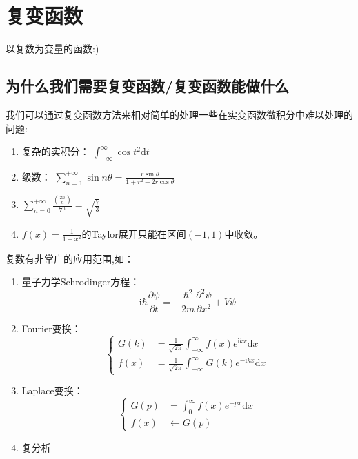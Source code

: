 % 
% 
\chapter{复变函数}
	以复数为变量的函数:)
\section{为什么我们需要复变函数/复变函数能做什么}
我们可以通过复变函数方法来相对简单的处理一些在实变函数微积分中难以处理的问题:
\begin{enumerate}[fullwidth,itemindent=2em,label=(\arabic*)]
	\item 复杂的实积分： $\int_{-\infty}^{\infty}\cos t^2 \mathrm{d}t$
	\item 级数： $\sum_{n=1}^{+\infty}\sin n\theta = \frac{r\sin \theta}{1+r^2-2r\cos \theta}$
	\item $\sum_{n=0}^{+\infty}\frac{\binom{2n}{n}}{7^n} = \sqrt{\frac{7}{3}}$
	\item $f(x) = \frac{1}{1+x^2}$的Taylor展开只能在区间$(-1,1)$中收敛。
\end{enumerate}

	复数有非常广的应用范围,如：
	\begin{enumerate}[fullwidth,itemindent=2em,label=(\arabic*)]
		\item 量子力学Schrodinger方程：
		\begin{equation}
			\mathrm{i}\hbar \frac{\partial \psi}{\partial t} = -\frac{\hbar^2}{2m}\frac{\partial^2\psi}{\partial x^2}+V\psi
		\end{equation}
		\item Fourier变换：
		\begin{equation}
			\left\{
			\begin{array}{ll}
			G(k) &= \frac{1}{\sqrt{2\pi}}\int_{-\infty}^{\infty}f(x)e^{\mathrm{i}kx}\mathrm{d}x\\
			f(x) &= \frac{1}{\sqrt{2\pi}}\int_{-\infty}^{\infty}G(k)e^{-\mathrm{i}kx}\mathrm{d}x
			\end{array}
			\right.
		\end{equation}
		\item Laplace变换：
		\begin{equation}
		\left\{
		\begin{array}{ll}
		G(p) &= \int_{0}^{\infty}f(x)e^{-px}\mathrm{d}x\\
		f(x) &\leftarrow G(p)
		\end{array}
		\right.
		\end{equation}
		\item 复分析
	\end{enumerate}

